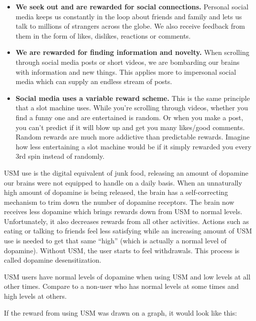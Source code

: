 \documentclass[
  openany]{book}
\providecommand{\tightlist}{%
  \setlength{\itemsep}{0pt}\setlength{\parskip}{0pt}}
\newenvironment{rmdnote}{
\color{blue}
\begin{framed}}{\end{framed}}
\begin{document}
\begin{itemize}
\tightlist
\item
  \textbf{We seek out and are rewarded for social connections.} Personal social media keeps us constantly in the loop about friends and family and lets us talk to millions of strangers across the globe. We also receive feedback from them in the form of likes, dislikes, reactions or comments.
\item
  \textbf{We are rewarded for finding information and novelty.} When scrolling through social media posts or short videos, we are bombarding our brains with information and new things. This applies more to impersonal social media which can supply an endless stream of posts.
\item
  \textbf{Social media uses a variable reward scheme.} This is the same principle that a slot machine uses. While you're scrolling through videos, whether you find a funny one and are entertained is random. Or when you make a post, you can't predict if it will blow up and get you many likes/good comments. Random rewards are much more addictive than predictable rewards. Imagine how less entertaining a slot machine would be if it simply rewarded you every 3rd spin instead of randomly.
\end{itemize}

USM use is the digital equivalent of junk food, releasing an amount of dopamine our brains were not equipped to handle on a daily basis. When an unnaturally high amount of dopamine is being released, the brain has a self-correcting mechanism to trim down the number of dopamine receptors. The brain now receives less dopamine which brings rewards down from USM to normal levels. Unfortunately, it also decreases rewards from all other activities. Actions such as eating or talking to friends feel less satisfying while an increasing amount of USM use is needed to get that same ``high'' (which is actually a normal level of dopamine). Without USM, the user starts to feel withdrawals. This process is called dopamine desensitization.

\begin{rmdnote}
USM users have normal levels of dopamine when using USM and low levels at all other times. Compare to a non-user who has normal levels at some times and high levels at others.

\end{rmdnote}

If the reward from using USM was drawn on a graph, it would look like this:
\end{document}
